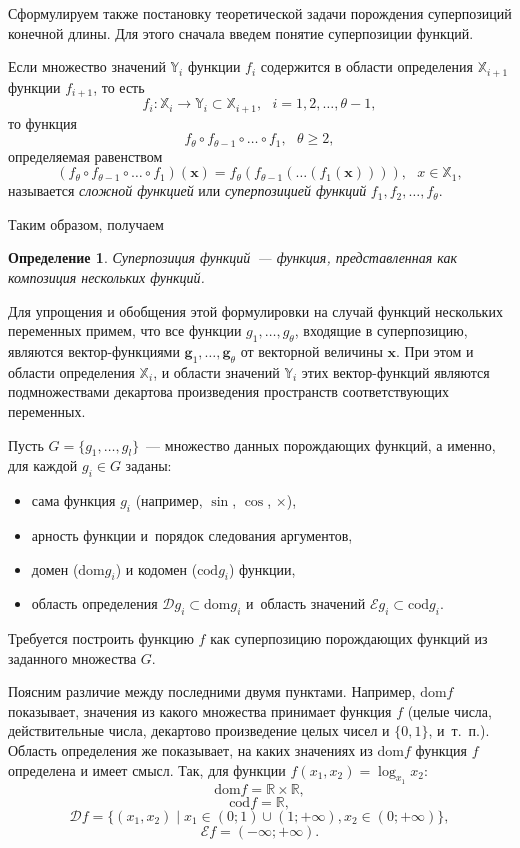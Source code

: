 \documentclass[12pt,a4paper]{article}
\newtheorem{defin}{Определение}
\begin{document}
Сформулируем также постановку теоретической задачи порождения суперпозиций
конечной длины. Для этого сначала введем понятие суперпозиции функций.

Если множество значений $\mathbb{Y}_i$ функции $f_i$ содержится в области
определения $\mathbb{X}_{i+1}$ функции $f_{i+1}$, то есть
\[
f_i : \mathbb{X}_i \to \mathbb{Y}_i \subset \mathbb{X}_{i+1}, ~~~ i = 1, 2, \dots, \theta - 1,
\]
то функция
\[
f_\theta \circ f_{\theta-1} \circ \dots \circ f_1, ~~~ \theta \geq 2,
\]
определяемая равенством
\[
(f_\theta \circ f_{\theta-1} \circ \dots \circ f_1) (\mathbf{x}) =
  f_{\theta} (f_{\theta-1} (\dots (f_1 (\mathbf{x})))), ~~~ x \in \mathbb{X}_1,
\]
называется \emph{сложной функцией} \cite{MathEnc1984_4} или
\emph{суперпозицией функций} $f_1, f_2, \dots, f_\theta$.

Таким образом, получаем
\begin{defin}
  Суперпозиция функций~--- функция, представленная как композиция нескольких
  функций. 
\end{defin}

Для упрощения и обобщения этой формулировки на случай функций нескольких
переменных примем, что все функции $g_1, \dots, g_\theta$, входящие в
суперпозицию, являются вектор-функциями $\mathbf{g}_1, \dots, \mathbf{g}_\theta$
от векторной величины $\mathbf{x}$. При этом и области определения
$\mathbb{X}_i$, и области значений $\mathbb{Y}_i$ этих вектор-функций являются
подмножествами декартова произведения пространств соответствующих переменных.

Пусть $G = \{ g_1, \dots, g_l \}$~--- множество данных порождающих
функций, а именно, для каждой $g_i \in G$ заданы:
\begin{itemize}
  \item сама функция $g_i$ (например, $\sin$, $\cos$, $\times$),
  \item арность функции и~порядок следования аргументов,
  \item домен ($\text{dom} g_i$) и кодомен ($\text{cod} g_i$) функции,
  \item область определения $\mathcal{D} g_i \subset \text{dom} g_i$ и~область
	значений $\mathcal{E} g_i \subset \text{cod} g_i$.
\end{itemize}
Требуется построить функцию $f$ как суперпозицию порождающих
функций из заданного множества $G$.

Поясним различие между последними двумя пунктами. Например, $\text{dom} f$
показывает, значения из какого множества принимает функция $f$ (целые числа,
действительные числа, декартово произведение целых чисел и $\{0, 1\}$,
и~т.~п.). Область определения же показывает, на каких значениях из
$\text{dom} f$ функция $f$ определена и имеет смысл. Так, для функции
$f(x_1, x_2) = \log_{x_1} x_2$:
\[
  \text{dom} f = \mathbb{R} \times \mathbb{R},
\]
\[
  \text{cod} f = \mathbb{R},
\]
\[
  \mathcal{D} f = \{ (x_1, x_2) \mid x_1 \in (0; 1) \cup (1; +\infty), x_2 \in (0; +\infty) \},
\]
\[
  \mathcal{E} f = (-\infty; +\infty).
\]
\end{document}
